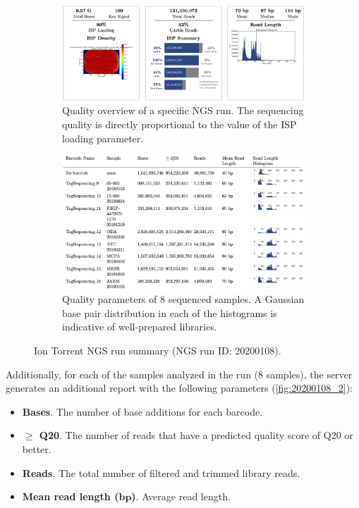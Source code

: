 \begin{figure}[ht]
    \centering
    \begin{subfigure}{0.85\textwidth}
        \centering
        \includegraphics[width=\textwidth]{Images/chapter_3/20200108/20200108_1.png}
        \caption{Quality overview of a specific NGS run. The sequencing quality is directly proportional to the value of the ISP loading parameter. \\}
        \label{fig:20200108_1}
    \end{subfigure}
    \hfill
    \begin{subfigure}{0.85\textwidth}
        \centering
        \includegraphics[width=\textwidth]{Images/chapter_3/20200108/20200108_2.png}
        \caption{Quality parameters of 8 sequenced samples. A Gaussian  base pair distribution in each of the histograms is indicative of well-prepared libraries.}
        \label{fig:20200108_2}
    \end{subfigure}
    \hfill
    \caption{Ion Torrent\texttrademark{} NGS run summary (NGS run ID: 20200108).}
    \label{fig:NGS_summary}
\end{figure}

Additionally, for each of the samples analyzed in the run (8 samples), the server generates an additional report with the following parameters (\autoref{fig:20200108_2}):
\begin{itemize}
    \item \textbf{Bases}. The number of base additions for each barcode.
    \item \textbf{$\boldsymbol{\ge}$ Q20}. The number of reads that have a predicted quality score of Q20 or better.
    \item \textbf{Reads}. The total number of filtered and trimmed library reads.
    \item \textbf{Mean read length ($\boldsymbol{bp}$)}. Average read length.
\end{itemize}

